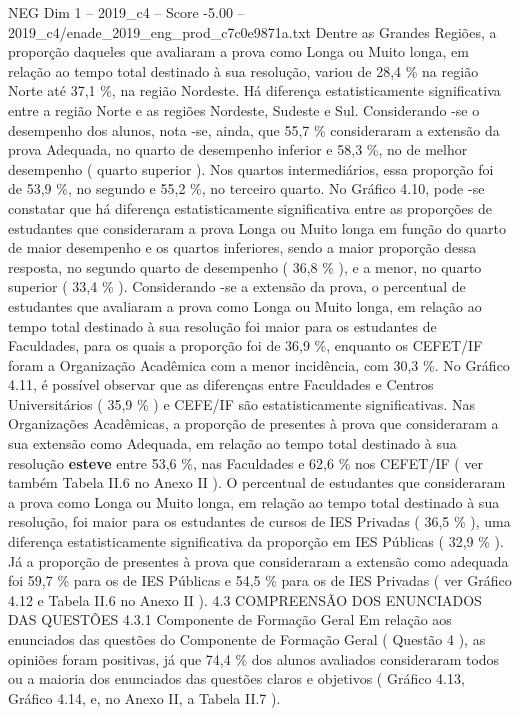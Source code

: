 \begin{textsample}{NEG Dim 1 – 2019\_c4 – Score -5.00 – 2019\_c4/enade\_2019\_eng\_prod\_c7c0e9871a.txt}
Dentre as Grandes Regiões, a proporção daqueles que avaliaram a prova como Longa ou Muito longa, em relação ao tempo total destinado à sua resolução, variou de 28,4 \% na região Norte até 37,1 \%, na região Nordeste.
Há diferença estatisticamente significativa entre a região Norte e as regiões Nordeste, Sudeste e Sul.
Considerando -se o desempenho dos alunos, nota -se, ainda, que 55,7 \% consideraram a extensão da prova Adequada, no quarto de desempenho inferior e 58,3 \%, no de melhor desempenho ( quarto superior ).
Nos quartos intermediários, essa proporção foi de 53,9 \%, no segundo e 55,2 \%, no terceiro quarto.
No Gráfico 4.10, pode -se constatar que há diferença estatisticamente significativa entre as proporções de estudantes que consideraram a prova Longa ou Muito longa em função do quarto de maior desempenho e os quartos inferiores, sendo a maior proporção dessa resposta, no segundo quarto de desempenho ( 36,8 \% ), e a menor, no quarto superior ( 33,4 \% ).
Considerando -se a extensão da prova, o percentual de estudantes que avaliaram a prova como Longa ou Muito longa, em relação ao tempo total destinado à sua resolução foi maior para os estudantes de Faculdades, para os quais a proporção foi de 36,9 \%, enquanto os CEFET/IF foram a Organização Acadêmica com a menor incidência, com 30,3 \%.
No Gráfico 4.11, é possível observar que as diferenças entre Faculdades e Centros Universitários ( 35,9 \% ) e CEFE/IF são estatisticamente significativas.
Nas Organizações Acadêmicas, a proporção de presentes à prova que consideraram a sua extensão como Adequada, em relação ao tempo total destinado à sua resolução \textbf{esteve} entre 53,6 \%, nas Faculdades e 62,6 \% nos CEFET/IF ( ver também Tabela II.6 no Anexo II ).
O percentual de estudantes que consideraram a prova como Longa ou Muito longa, em relação ao tempo total destinado à sua resolução, foi maior para os estudantes de cursos de IES Privadas ( 36,5 \% ), uma diferença estatisticamente significativa da proporção em IES Públicas ( 32,9 \% ).
Já a proporção de presentes à prova que consideraram a extensão como adequada foi 59,7 \% para os de IES Públicas e 54,5 \% para os de IES Privadas ( ver Gráfico 4.12 e Tabela II.6 no Anexo II ). 4.3 COMPREENSÃO DOS ENUNCIADOS DAS QUESTÕES 4.3.1 Componente de Formação Geral Em relação aos enunciados das questões do Componente de Formação Geral ( Questão 4 ), as opiniões foram positivas, já que 74,4 \% dos alunos avaliados consideraram todos ou a maioria dos enunciados das questões claros e objetivos ( Gráfico 4.13, Gráfico 4.14, e, no Anexo II, a Tabela II.7 ).

\end{textsample}
